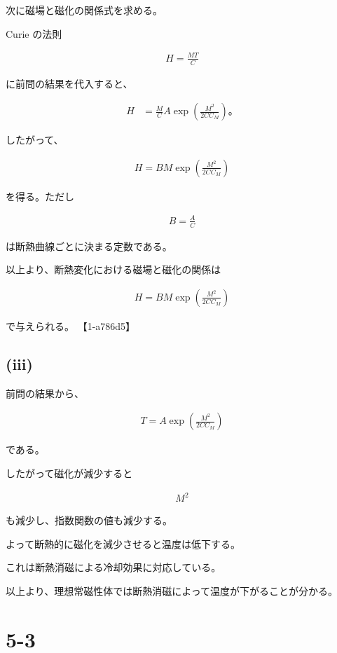 \documentclass[platex,dvipdfmx,a4paper]{jsarticle}
\begin{document}
次に磁場と磁化の関係式を求める。

Curie の法則

\begin{align*}
H=\frac{MT}{C}
\end{align*}

に前問の結果を代入すると、

\begin{align*}
H
&=
\frac{M}{C}
A
\exp\left(
\frac{M^2}{2CC_M}
\right)。
\end{align*}

したがって、

\begin{align*}
H
=
B
M
\exp\left(
\frac{M^2}{2CC_M}
\right)
\end{align*}

を得る。ただし

\begin{align*}
B=\frac{A}{C}
\end{align*}

は断熱曲線ごとに決まる定数である。

以上より、断熱変化における磁場と磁化の関係は

\begin{align*}
H
=
B
M
\exp\left(
\frac{M^2}{2CC_M}
\right)
\end{align*}

で与えられる。 【1-a786d5】

\subsection{(iii)}

前問の結果から、

\begin{align*}
T
=
A
\exp\left(
\frac{M^2}{2CC_M}
\right)
\end{align*}

である。

したがって磁化が減少すると

\begin{align*}
M^2
\end{align*}

も減少し、指数関数の値も減少する。

よって断熱的に磁化を減少させると温度は低下する。

これは断熱消磁による冷却効果に対応している。

以上より、理想常磁性体では断熱消磁によって温度が下がることが分かる。
\section{5-3}
\end{document}

